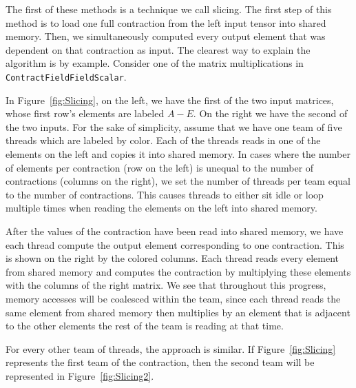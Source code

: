 The first of these methods is a technique we call slicing. The first
step of this method is to load one full contraction from the left input tensor into
shared memory. Then, we simultaneously computed every output element that was
dependent on that contraction as input. The clearest way to explain the
algorithm is by example. Consider one of the matrix multiplications in
\texttt{ContractFieldFieldScalar}. 

    In Figure~\ref{fig:Slicing}, on the left, we have the first of the two input matrices, whose first row's
elements are labeled $A-E$. On the right we have the second of the two inputs.
For the sake of simplicity, assume that we have one team of five threads which
are labeled by color. Each of the threads reads in one of the elements on the
left and copies it into shared memory. In cases where the number of elements
per contraction (row on the left) is unequal to the number of contractions
(columns on the right), we set the number of threads per team equal to the
number of contractions. This causes threads to either sit idle or loop multiple
times when reading the elements on the left into shared memory.
	
    After the values of the contraction have been read into shared memory, we
have each thread compute the output element corresponding to one contraction.
This is shown on the right by the colored columns. Each thread reads every
element from shared memory and computes the contraction by multiplying these
elements with the columns of the right matrix. We see that throughout this
progress, memory accesses will be coalesced within the team, since each thread
reads the same element from shared memory then multiplies by an element that is
adjacent to the other elements the rest of the team is reading at that time. 
	
    For every other team of threads, the approach is similar. If Figure~\ref{fig:Slicing}
represents the first team of the contraction, then the second team will be
represented in Figure~\ref{fig:Slicing2}. 

